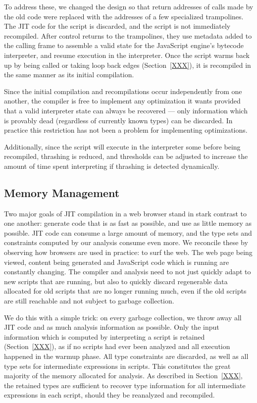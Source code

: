 To address these, we changed the design so that return addresses of
calls made by the old code were replaced with the addresses of
a few specialized trampolines.
The JIT code for the script is discarded, and the script is not
immediately recompiled.
After control returns to the trampolines, they use metadata added to
the calling frame to assemble
a valid state for the JavaScript engine's bytecode interpreter,
and resume execution in the interpreter.
Once the script warms back up by being called or taking loop back edges
(Section~\ref{XXX}), it is recompiled in the same manner as its
initial compilation.

Since the initial compilation and recompilations occur independently
from one another, the compiler is free to implement any optimization it
wants provided that a valid interpreter state can always be recovered ---
only information which is provably dead (regardless of currently known types)
can be discarded.
In practice this restriction has not been a problem for
implementing optimizations.

Additionally, since the script will execute in the interpreter some before
being recompiled, thrashing is reduced, and thresholds can be adjusted to
increase the amount of time spent interpreting if thrashing is detected
dynamically.

\subsection{Memory Management}

Two major goals of JIT compilation in a web browser stand in stark contrast
to one another: generate code that is as fast as possible, and use as little
memory as possible.
JIT code can consume a large amount of memory, and the type sets and constraints
computed by our analysis consume even more.
We reconcile these by observing how browsers are used in practice:
to surf the web.
The web page being viewed, content being generated and JavaScript code which
is running are constantly changing.
The compiler and analysis need to not just quickly adapt to new scripts that are
running, but also to quickly discard regenerable data allocated for
old scripts that are no longer running much, even if the old scripts are still
reachable and not subject to garbage collection.

We do this with a simple trick:
on every garbage collection, we throw away all JIT code and as much analysis
information as possible.
Only the input information which is computed by interpreting
a script is retained (Section~\ref{XXX}),
as if no scripts had ever been analyzed and all
execution happened in the warmup phase.
All type constraints are discarded, as well as all type sets for
intermediate expressions in scripts.
This constitutes the great majority of the memory allocated for analysis.
As described in Section~\ref{XXX}, the retained types are sufficient to
recover type information for all intermediate expressions in each script,
should they be reanalyzed and recompiled.

